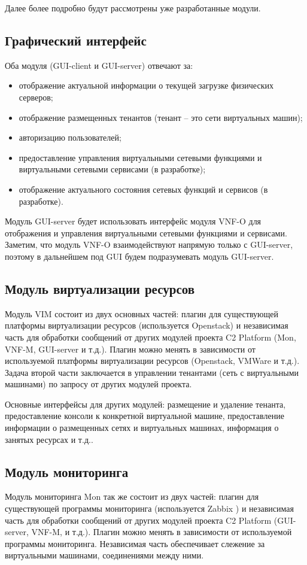 \documentclass[oneside,final,14pt,a4paper]{extreport}
\begin{document}
Далее более подробно будут рассмотрены уже разработанные модули.

\subsection{Графический интерфейс}
Оба модуля (GUI-client и GUI-server) отвечают за:
\begin{itemize}
	\item отображение актуальной информации о текущей загрузке физических серверов;
	\item отображение размещенных тенантов (тенант -- это сети виртуальных машин);
	\item авторизацию пользователей;
	\item предоставление управления виртуальными сетевыми функциями и виртуальными сетевыми сервисами (в разработке);
	\item отображение актуального состояния сетевых функций и сервисов (в разработке).
\end{itemize}

Модуль GUI-server будет использовать интерфейс модуля VNF-O для отображения и управления виртуальными сетевыми функциями и сервисами. Заметим, что модуль VNF-O взаимодействуют напрямую только с GUI-server, поэтому в дальнейшем под GUI будем подразумевать модуль GUI-server.

\subsection{Модуль виртуализации ресурсов}
Модуль VIM состоит из двух основных частей: плагин для существующей платформы виртуализации ресурсов (используется Openstack) и независимая часть для обработки сообщений от других модулей проекта C2 Platform (Mon, VNF-M, GUI-server и т.д.). Плагин можно менять в зависимости от используемой платформы виртуализации ресурсов (Openstack, VMWare и т.д.). Задача второй части заключается в управлении тенантами (сеть с виртуальными машинами) по запросу от других модулей проекта. 

Основные интерфейсы для других модулей: размещение и удаление тенанта, предоставление консоли к конкретной виртуальной машине, предоставление информации о размещенных сетях и виртуальных машинах, информация о занятых ресурсах и т.д..

\subsection{Модуль мониторинга}
Модуль мониторинга Mon так же состоит из двух частей: плагин для существующей программы мониторинга (используется Zabbix \cite{bib:zabbix}) и независимая часть для обработки сообщений от других модулей проекта C2 Platform (GUI-server, VNF-M, и т.д.). Плагин можно менять в зависимости от используемой программы мониторинга. Независимая часть обеспечивает слежение за виртуальными машинами, соединениями между ними.
\end{document}
